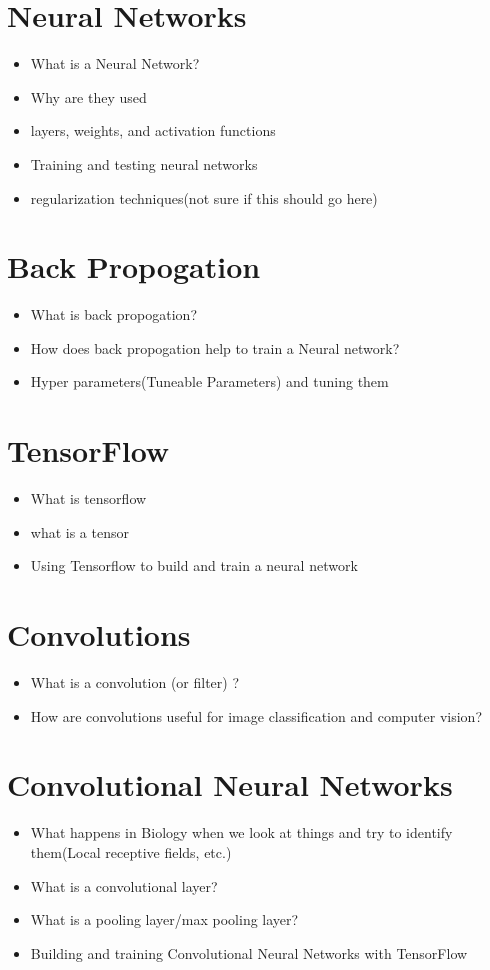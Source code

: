 \documentclass[12pt]{article} %
\begin{document}
	
	
	
	 


\section{Neural Networks}
\begin{itemize}
\item What is a Neural Network?
\item Why are they used
\item layers, weights, and activation functions
\item Training and testing neural networks 
\item regularization techniques(not sure if this should go here)
\end{itemize}


\section{Back Propogation}
\begin{itemize}
\item What is back propogation?
\item How does back propogation help to train a Neural network?
\item Hyper parameters(Tuneable Parameters) and tuning them
\end{itemize}

\section{TensorFlow}
\begin{itemize}
\item What is tensorflow
\item what is a tensor
\item Using Tensorflow to build and train a neural network
\end{itemize}


\section{Convolutions}
\begin{itemize}
\item What is a convolution (or filter) ?
\item How are convolutions useful for image classification and computer vision?
\end{itemize}

\section{Convolutional Neural Networks}
\begin{itemize}
\item What happens in Biology when we look at things and try to identify them(Local receptive fields, etc.)
\item What is a convolutional layer?
\item What is a pooling layer/max pooling layer?
\item Building and training Convolutional Neural Networks with TensorFlow
\end{itemize}
\end{document}

